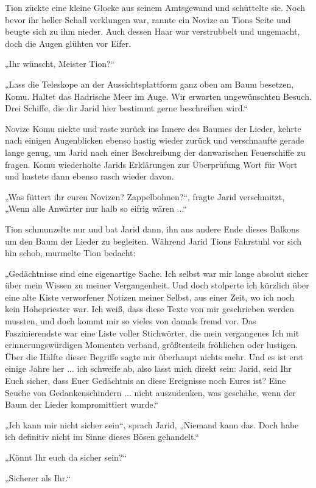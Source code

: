 Tion zückte eine kleine Glocke aus seinem Amtsgewand und schüttelte sie. Noch bevor ihr heller Schall verklungen war, rannte ein Novize an Tions Seite und beugte sich zu ihm nieder. Auch dessen Haar war verstrubbelt und ungemacht, doch die Augen glühten vor Eifer.

„Ihr wünscht, Meister Tion?“

„Lass die Teleskope an der Aussichtsplattform ganz oben am Baum besetzen, Komu. Haltet das Hadrische Meer im Auge. Wir erwarten ungewünschten Besuch. Drei Schiffe, die dir Jarid hier bestimmt gerne beschreiben wird.“

Novize Komu nickte und raste zurück ins Innere des Baumes der Lieder, kehrte nach einigen Augenblicken ebenso hastig wieder zurück und verschnaufte gerade lange genug, um Jarid nach einer Beschreibung der danwarischen Feuerschiffe zu fragen. Komu wiederholte Jarids Erklärungen zur Überprüfung Wort für Wort und hastete dann ebenso rasch wieder davon.

„Was füttert ihr euren Novizen? Zappelbohnen?“, fragte Jarid verschmitzt, „Wenn alle Anwärter nur halb so eifrig wären ...“

Tion schmunzelte nur und bat Jarid dann, ihn ans andere Ende dieses Balkons um den Baum der Lieder zu begleiten. Während Jarid Tions Fahrstuhl vor sich hin schob, murmelte Tion bedacht:

„Gedächtnisse sind eine eigenartige Sache. Ich selbst war mir lange absolut sicher über mein Wissen zu meiner Vergangenheit. Und doch stolperte ich kürzlich über eine alte Kiste verworfener Notizen meiner Selbst, aus einer Zeit, wo ich noch kein Hohepriester war. Ich weiß, dass diese Texte von mir geschrieben werden mussten, und doch kommt mir so vieles von damals fremd vor. Das Faszinierendste war eine Liste voller Stichwörter, die mein vergangenes Ich mit erinnerungswürdigen Momenten verband, größtenteils fröhlichen oder lustigen. Über die Hälfte dieser Begriffe sagte mir überhaupt nichts mehr. Und es ist erst einige Jahre her ... ich schweife ab, also lasst mich direkt sein: Jarid, seid Ihr Euch sicher, dass Euer Gedächtnis an diese Ereignisse noch Eures ist? Eine Seuche von Gedankenschindern ... nicht auszudenken, was geschähe, wenn der Baum der Lieder kompromittiert wurde.“

„Ich kann mir nicht sicher sein“, sprach Jarid, „Niemand kann das. Doch habe ich definitiv nicht im Sinne dieses Bösen gehandelt.“

„Könnt Ihr euch da sicher sein?“

„Sicherer als Ihr.“

